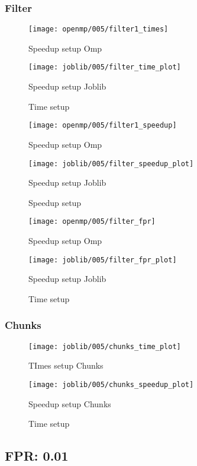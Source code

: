 \subsubsection{Filter}\label{subsubsec:fpr-005-filter}
\begin{figure}[H]
    \centering
    \texttt{[image: openmp/005/filter1\_times]}
        \caption{Speedup setup Omp}\label{fig:005-filter_time_omp}
    \endminipage\hfill
    \texttt{[image: joblib/005/filter\_time\_plot]}
        \caption{Speedup setup Joblib}\label{fig:005-filter_time_joblib}
    \endminipage\hfill
    \caption{Time setup}
\end{figure}
\begin{figure}[H]
    \centering
    \texttt{[image: openmp/005/filter1\_speedup]}
        \caption{Speedup setup Omp}\label{fig:005-filter_speedup_omp}
    \endminipage\hfill
    \texttt{[image: joblib/005/filter\_speedup\_plot]}
        \caption{Speedup setup Joblib}\label{fig:005-filter_speedup_joblib}
    \endminipage\hfill
    \caption{Speedup setup}
\end{figure}
\begin{figure}[H]
    \centering
    \texttt{[image: openmp/005/filter\_fpr]}
        \caption{Speedup setup Omp}\label{fig:005-filter_fpr_omp}
    \endminipage\hfill
    \texttt{[image: joblib/005/filter\_fpr\_plot]}
        \caption{Speedup setup Joblib}\label{fig:005-filter_fpr_joblib}
    \endminipage\hfill
    \caption{Time setup}
\end{figure}
\subsubsection{Chunks}\label{subsubsec:005-chunks}
\begin{figure}[H]
    \centering
    \texttt{[image: joblib/005/chunks\_time\_plot]}
        \caption{TImes setup Chunks}\label{fig:005-chunks_time}
    \endminipage\hfill
    \texttt{[image: joblib/005/chunks\_speedup\_plot]}
        \caption{Speedup setup Chunks}\label{fig:005-chunks_speedup}
    \endminipage\hfill
    \caption{Time setup}
\end{figure}

\subsection{FPR: 0.01}\label{subsec:fpr-001}
